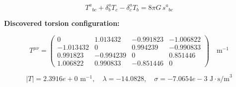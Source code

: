 
\begin{equation}
  T^a{}_{bc} + \delta^a_b T_c - \delta^a_c T_b = 8\pi G \, s^a{}_{bc}
\end{equation}

\textbf{Discovered torsion configuration:}

\begin{equation}
  T^{\mu\nu} = \begin{pmatrix}
    0 & 1.013432 & -0.991823 & -1.006822 \\
    -1.013432 & 0 & 0.994239 & -0.990833 \\
    0.991823 & -0.994239 & 0 & 0.851446 \\
    1.006822 & 0.990833 & -0.851446 & 0
  \end{pmatrix} \quad \text{m}^{-1}
\end{equation}

\begin{equation}
  |T| = 2.3916e+0 \text{ m}^{-1}, \quad
  \lambda = -14.0828, \quad
  \sigma = -7.0654e-3 \text{ J}\cdot\text{s/m}^3
\end{equation}
